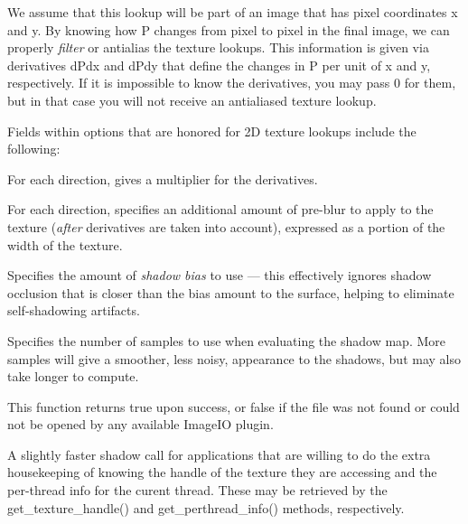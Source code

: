 We assume that this lookup will be part of an image that has pixel
coordinates {\cf x} and {\cf y}.  By knowing how {\cf P} changes from
pixel to pixel in the final image, we can properly \emph{filter} or
antialias the texture lookups.  This information is given via
derivatives {\cf dPdx} and {\cf dPdy} that define the changes in {\cf P}
per unit of {\cf x} and {\cf y}, respectively.  If it is impossible to
know the derivatives, you may pass 0 for them, but in that case you will
not receive an antialiased texture lookup.

Fields within {\cf options} that are honored for 2D texture lookups
include the following:

\vspace{-12pt}
\vspace{10pt}
For each direction, gives a multiplier for the derivatives.
\apiend

\vspace{-24pt}
\vspace{10pt}
For each direction, specifies an additional amount of pre-blur to apply
to the texture (\emph{after} derivatives are taken into account),
expressed as a portion of the width of the texture.
\apiend

\vspace{-24pt}
\vspace{10pt}
Specifies the amount of \emph{shadow bias} to use --- this effectively
ignores shadow occlusion that is closer than the bias amount to the
surface, helping to eliminate self-shadowing artifacts.
\apiend

\vspace{-24pt}
\vspace{10pt}
Specifies the number of samples to use when evaluating the shadow map.
More samples will give a smoother, less noisy, appearance to the
shadows, but may also take longer to compute.
\apiend

This function returns {\cf true} upon success, or {\cf false} if the
file was not found or could not be opened by any available ImageIO
plugin.
\apiend

A slightly faster {\cf shadow} call for applications that are willing
to do the extra housekeeping of knowing the handle of the texture they
are accessing and the per-thread info for the curent thread.  These
may be retrieved by the {\cf get_texture_handle()} and 
{\cf get_perthread_info()} methods, respectively.
\apiend


